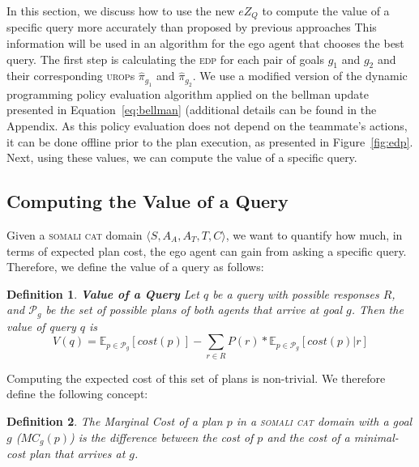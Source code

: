 \documentclass[letterpaper]{article}
\newtheorem{definition}{Definition}
\begin{document}
In this section, we discuss how to use the new $eZ_Q$ to compute the value of a specific query more accurately than proposed by previous approaches
This information will be used in an algorithm for the ego agent that chooses the best query. %
The first step is calculating the \textsc{edp} for each pair of goals $g_1$ and $g_2$ and their corresponding \textsc{urop}s $\hat{\pi}_{g_1}$ and $\hat{\pi}_{g_2}$. %
We use a modified version of the dynamic programming policy evaluation algorithm \cite{bellman1966dynamic} applied on the bellman update presented in Equation~\ref{eq:bellman} (additional details can be found in the Appendix.
As this policy evaluation does not depend on the teammate's actions, it can be done offline prior to the plan execution, as presented in Figure~\ref{fig:edp}. Next, using these values, we can compute the value of a specific query.

\subsection{Computing the Value of a Query}

Given a \textsc{somali cat} domain $\langle S, A_A, A_T, T, C\rangle$, we want to
quantify how much, in terms of expected plan cost, the ego agent can gain from asking a specific query.
Therefore, we define the value of a query as follows:
\begin{definition}
\textbf{Value of a Query} Let $q$ be a query with possible responses $R$, and $\mathcal{P}_g$ be the set of possible plans of both agents that arrive at goal $g$. Then the value of query $q$ is
\begin{equation}
    V(q) = \mathbb{E}_{p\in \mathcal{P}_g}[cost(p)] - \sum\limits_{r\in R}P(r)*\mathbb{E}_{p\in \mathcal{P}_g}[cost(p) | r]
\label{eq:value}
\end{equation}
\end{definition}

\noindent Computing the expected cost of this set of plans is non-trivial. We therefore define the following concept:
\begin{definition}
The \emph{Marginal Cost} of a plan $p$ in a \textsc{somali cat} domain with a goal $g$ ($MC_g(p)$) is the difference between the cost of $p$ and the cost of a minimal-cost plan that arrives at $g$.
\label{def:mc}
\end{definition}
\end{document}
